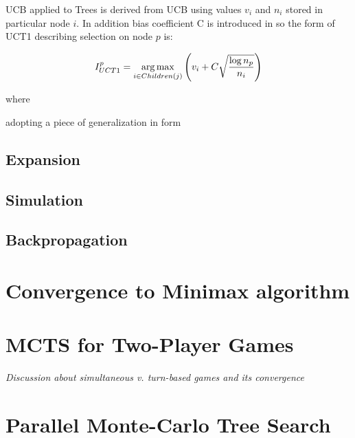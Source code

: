 UCB applied to Trees \cite{Kocsis2006} is derived from UCB using values $v_i$ and $n_i$ stored in
particular node $i$. In addition bias coefficient C is introduced in \cite{Chaslot2008} so the form of
UCT1 describing selection on node $p$ is:

\begin{equation}
I_{UCT1}^p = \operatorname*{arg\,max}\limits_{i \in Children(j)} \left( v_i + C \sqrt{\log{n_p} \over{n_i}}\right)
\end{equation}

where 

 adopting a piece of
generalization in form 

\subsection{Expansion}


\subsection{Simulation}


\subsection{Backpropagation}



\section{Convergence to Minimax algorithm}
\label{sec_minimax_convergence}

\section{MCTS for Two-Player Games}
\emph{Discussion about simultaneous v. turn-based games and its convergence}

\section{Parallel Monte-Carlo Tree Search}







